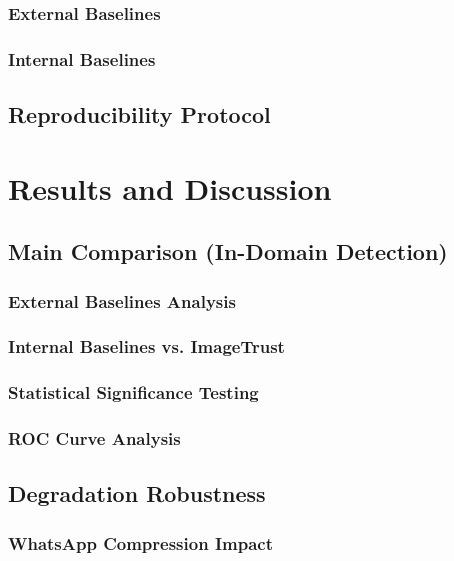\subsection{External Baselines}
\subsection{Internal Baselines}

\section{Reproducibility Protocol}\label{sec:reproducibility}



\chapter{Results and Discussion}\label{chap:results}

\section{Main Comparison (In-Domain Detection)}\label{sec:main-comparison}
\subsection{External Baselines Analysis}
\subsection{Internal Baselines vs. ImageTrust}
\subsection{Statistical Significance Testing}
\subsection{ROC Curve Analysis}

\section{Degradation Robustness}\label{sec:degradation}
\subsection{WhatsApp Compression Impact}
